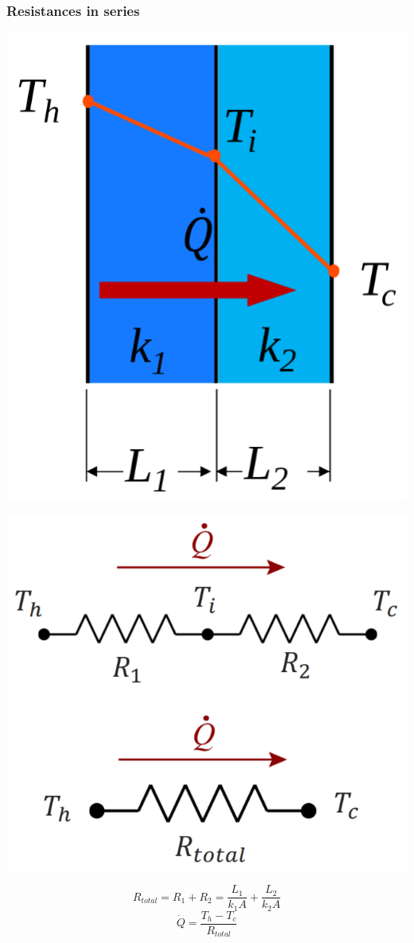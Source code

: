 \documentclass[11pt]{article}
\begin{document}
\subsubsection{Resistances in series}
\label{sec:org600dd87}
\begin{center}
\includegraphics[scale=0.7]{./images/thermal-resistances-in-series.png}
\end{center}
\begin{center}
\includegraphics[scale=0.7]{./images/thermal-resistances-in-series-electrical-analogy.png}
\end{center}
\[R_{total} = R_1 + R_2 = \frac{L_1}{k_1 A} + \frac{L_2}{k_2 A}\]
\[\dot{Q} = \frac{T_h - T_c}{R_{total}}\]
\end{document}
